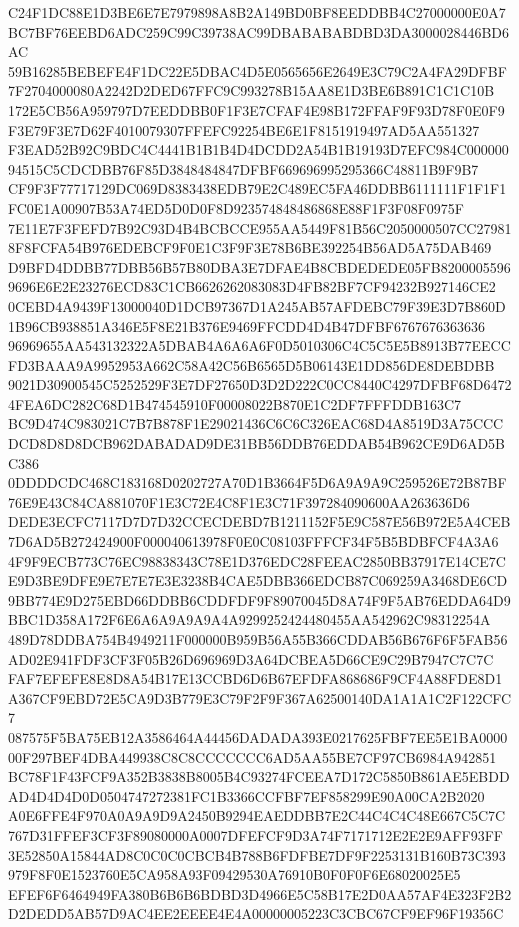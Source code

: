 \documentclass[UTF8,fontset=fandol,zihao=-4,a4paper]{ctexart}
\begin{document}
{{C24F1DC88E1D3BE6E7E7979898A8B2A149BD0BF8EEDDBB4C27000000E0A7BC7BF76EEBD6ADC259C99C39738AC99DBABABABDBD3DA3000028446BD6AC
59B16285BEBEFE4F1DC22E5DBAC4D5E0565656E2649E3C79C2A4FA29DFBF7F2704000080A2242D2DED67FFC9C993278B15AA8E1D3BE6B891C1C1C10B
172E5CB56A959797D7EEDDBB0F1F3E7CFAF4E98B172FFAF9F93D78F0E0F9F3E79F3E7D62F4010079307FFEFC92254BE6E1F8151919497AD5AA551327
F3EAD52B92C9BDC4C4441B1B1B4D4DCDD2A54B1B19193D7EFC984C00000094515C5CDCDBB76F85D3848484847DFBF669696995295366C48811B9F9B7
CF9F3F77717129DC069D8383438EDB79E2C489EC5FA46DDBB6111111F1F1F1FC0E1A00907B53A74ED5D0D0F8D923574848486868E88F1F3F08F0975F
7E11E7F3FEFD7B92C93D4B4BCBCCE955AA5449F81B56C2050000507CC279818F8FCFA54B976EDEBCF9F0E1C3F9F3E78B6BE392254B56AD5A75DAB469
D9BFD4DDBB77DBB56B57B80DBA3E7DFAE4B8CBDEDEDE05FB82000055969696E6E2E23276ECD83C1CB6626262083083D4FB82BF7CF94232B927146CE2
0CEBD4A9439F13000040D1DCB97367D1A245AB57AFDEBC79F39E3D7B860D1B96CB938851A346E5F8E21B376E9469FFCDD4D4B47DFBF6767676363636
96969655AA543132322A5DBAB4A6A6A6F0D5010306C4C5C5E5B8913B77EECCFD3BAAA9A9952953A662C58A42C56B6565D5B06143E1DD856DE8DEBDBB
9021D30900545C5252529F3E7DF27650D3D2D222C0CC8440C4297DFBF68D64724FEA6DC282C68D1B474545910F00008022B870E1C2DF7FFFDDB163C7
BC9D474C983021C7B7B878F1E29021436C6C6C326EAC68D4A8519D3A75CCCDCD8D8D8DCB962DABADAD9DE31BB56DDB76EDDAB54B962CE9D6AD5BC386
0DDDDCDC468C183168D0202727A70D1B3664F5D6A9A9A9C259526E72B87BF76E9E43C84CA881070F1E3C72E4C8F1E3C71F397284090600AA263636D6
DEDE3ECFC7117D7D7D32CCECDEBD7B1211152F5E9C587E56B972E5A4CEB7D6AD5B272424900F000040613978F0E0C08103FFFCF34F5B5BDBFCF4A3A6
4F9F9ECB773C76EC98838343C78E1D376EDC28FEEAC2850BB37917E14CE7CE9D3BE9DFE9E7E7E7E3E3238B4CAE5DBB366EDCB87C069259A3468DE6CD
9BB774E9D275EBD66DDBB6CDDFDF9F89070045D8A74F9F5AB76EDDA64D9BBC1D358A172F6E6A6A9A9A9A4A9299252424480455AA542962C98312254A
489D78DDBA754B4949211F000000B959B56A55B366CDDAB56B676F6F5FAB56AD02E941FDF3CF3F05B26D696969D3A64DCBEA5D66CE9C29B7947C7C7C
FAF7EFEFE8E8D8A54B17E13CCBD6D6B67EFDFA868686F9CF4A88FDE8D1A367CF9EBD72E5CA9D3B779E3C79F2F9F367A62500140DA1A1A1C2F122CFC7
087575F5BA75EB12A3586464A44456DADADA393E0217625FBF7EE5E1BA000000F297BEF4DBA449938C8C8CCCCCCC6AD5AA55BE7CF97CB6984A942851
BC78F1F43FCF9A352B3838B8005B4C93274FCEEA7D172C5850B861AE5EBDDAD4D4D4D0D0504747272381FC1B3366CCFBF7EF858299E90A00CA2B2020
A0E6FFE4F970A0A9A9D9A2450B9294EAEDDBB7E2C44C4C4C48E667C5C7C767D31FFEF3CF3F89080000A0007DFEFCF9D3A74F7171712E2E2E9AFF93FF
3E52850A15844AD8C0C0C0CBCB4B788B6FDFBE7DF9F2253131B160B73C393979F8F0E1523760E5CA958A93F09429530A76910B0F0F0F6E68020025E5
EFEF6F6464949FA380B6B6B6BDBD3D4966E5C58B17E2D0AA57AF4E323F2B2D2DEDD5AB57D9AC4EE2EEEE4E4A00000005223C3CBC67CF9EF96F19356C
}}
\end{document}

